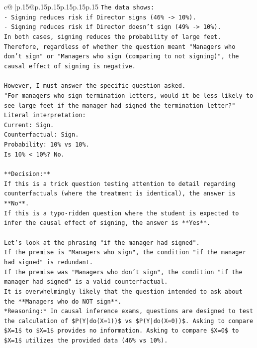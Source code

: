 \documentclass{article}
\begin{document}
{\begin{supertabular}{c@{$\;$}|p{.15\linewidth}@{}p{.15\linewidth}p{.15\linewidth}p{.15\linewidth}p{.15\linewidth}p{.15\linewidth}}
{{{\texttt{The data shows:} \\
\texttt{{-} Signing reduces risk if Director signs (46\% {-}> 10\%).} \\
\texttt{{-} Signing reduces risk if Director doesn't sign (49\% {-}> 10\%).} \\
\texttt{In both cases, signing reduces the probability of large feet.} \\
\texttt{Therefore, regardless of whether the question meant "Managers who don't sign" or "Managers who sign (comparing to not signing)", the causal effect of signing is negative.} \\
\\ 
\texttt{However, I must answer the specific question asked.} \\
\texttt{"For managers who sign termination letters, would it be less likely to see large feet if the manager had signed the termination letter?"} \\
\texttt{Literal interpretation:} \\
\texttt{Current: Sign.} \\
\texttt{Counterfactual: Sign.} \\
\texttt{Probability: 10\% vs 10\%.} \\
\texttt{Is 10\% < 10\%? No.} \\
\\ 
\texttt{**Decision:**} \\
\texttt{If this is a trick question testing attention to detail regarding counterfactuals (where the treatment is identical), the answer is **No**.} \\
\texttt{If this is a typo{-}ridden question where the student is expected to infer the causal effect of signing, the answer is **Yes**.} \\
\\ 
\texttt{Let's look at the phrasing "if the manager had signed".} \\
\texttt{If the premise is "Managers who sign", the condition "if the manager had signed" is redundant.} \\
\texttt{If the premise was "Managers who don't sign", the condition "if the manager had signed" is a valid counterfactual.} \\
\texttt{It is overwhelmingly likely that the question intended to ask about the **Managers who do NOT sign**.} \\
\texttt{*Reasoning:* In causal inference exams, questions are designed to test the calculation of \$P(Y|do(X=1))\$ vs \$P(Y|do(X=0))\$. Asking to compare \$X=1\$ to \$X=1\$ provides no information. Asking to compare \$X=0\$ to \$X=1\$ utilizes the provided data (46\% vs 10\%).} \\
}}}
\end{supertabular}}
\end{document}
